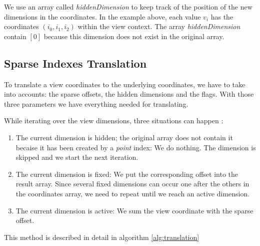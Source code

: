 We use an array called \textit{hiddenDimension} to keep track of the position of the new dimensions in the coordinates. In the example above, each value $v_{i}$ has the coordinates $(i_{0}, i_{1}, i_{2})$ within the view context. The array \textit{hiddenDimension} contain $[0]$ because this dimension does not exist in the original array.

\subsection{Sparse Indexes Translation}
\label{ssec:translation}

To translate a view coordinates to the underlying coordinates, we have to take into accounts: the sparse offsets, the hidden dimensions and the flags. With those three parameters we have everything needed for translating.



While iterating over the view dimensions, three situations can happen :
\begin{enumerate}
	\item The current dimension is hidden; the original array does not contain it becaise it has been created by a \textit{point} index: We do nothing. The dimension is skipped and we start the next iteration.
	\item The current dimension is fixed: We put the corresponding offset into the result array. Since several fixed dimensions can occur one after the others in the coordinates array, we need to repeat until we reach an active dimension.
	\item The current dimension is active: We sum the view coordinate with the sparse offset.
\end{enumerate}
This method is described in detail in algorithm \ref{alg:translation} 


